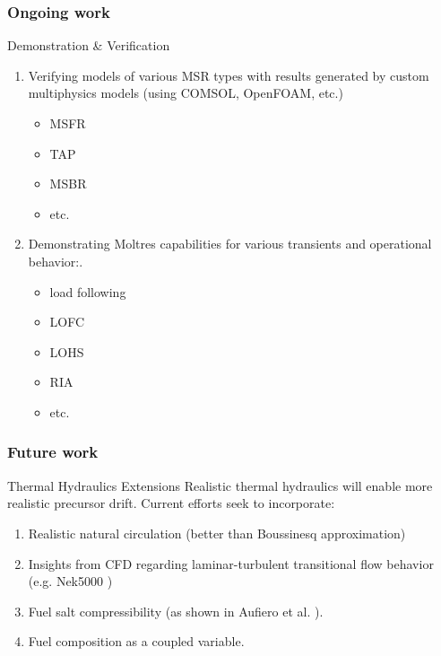 \begin{frame}
  \frametitle{Ongoing work}       
              \begin{block}{Demonstration \& Verification}
               \begin{enumerate}
                \item Verifying models of various \gls{MSR} types with results 
                        generated by custom multiphysics models (using COMSOL, 
                               OpenFOAM, etc.)
                        \begin{itemize}
                               \item \acrlong{MSFR}
                               \item \acrlong{TAP}
                               \item \acrlong{MSBR}
                               \item etc.
                        \end{itemize}
                \item Demonstrating Moltres capabilities for various transients 
                        and operational behavior:.
                        \begin{itemize}
                                \item load following
                               \item \acrlong{LOFC}
                               \item \acrlong{LOHS}
                               \item \acrlong{RIA}
                               \item etc.
                        \end{itemize}
               \end{enumerate}
               \end{block}
\end{frame}

\begin{frame}
  \frametitle{Future work}       
              \begin{block}{Thermal Hydraulics Extensions}
               Realistic thermal hydraulics will enable more realistic 
                      precursor drift.  Current efforts seek to incorporate:
               \begin{enumerate}
                \item Realistic natural circulation (better than Boussinesq approximation)
                \item Insights from \gls{CFD}
                        regarding laminar-turbulent transitional flow behavior  
                               (e.g. Nek5000 \cite{obabko_verification_2015}) 
               \item Fuel salt compressibility (as shown in Aufiero et 
                               al. \cite{aufiero_compressibility_2016}).
               \item Fuel composition as a coupled variable.
               \end{enumerate}
               \end{block}
\end{frame}
